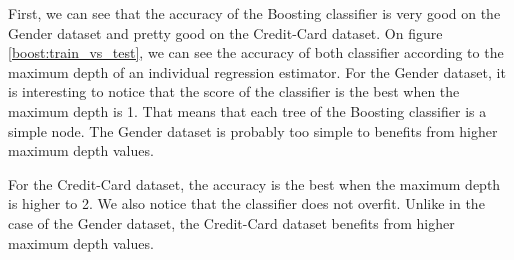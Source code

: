 \documentclass[10pt]{article}
\begin{document}
			First, we can see that the accuracy of the Boosting classifier is very good on the Gender dataset and pretty good on the Credit-Card dataset.
			On figure \ref{boost:train_vs_test}, we can see the accuracy of both classifier according to the maximum depth of an individual regression estimator. For the Gender dataset, it is interesting to notice that the score of the classifier is the best when the maximum depth is 1. That means that each tree of the Boosting classifier is a simple node. The Gender dataset is probably too simple to benefits from higher maximum depth values.

			For the Credit-Card dataset, the accuracy is the best when the maximum depth is higher to 2. We also notice that the classifier does not overfit. Unlike in the case of the Gender dataset, the Credit-Card dataset benefits from higher maximum depth values.
\end{document}
